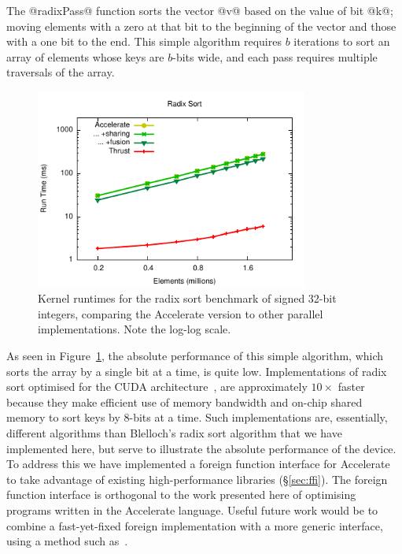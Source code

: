 The @radixPass@ function sorts the vector @v@ based on the value of
bit @k@; moving elements with a zero at that bit to the beginning of the
vector and those with a one bit to the end. This simple algorithm requires
$b$ iterations to sort an array of elements whose keys are $b$-bits wide, and
each pass requires multiple traversals of the array.

\begin{figure}
    \begin{center}
        \includegraphics[width=0.8\textwidth]{images/results/radixsort/radixsort}
    \end{center}
    \caption[Radix sort kernel benchmarks]{Kernel runtimes for the radix sort benchmark
        of signed 32-bit integers, comparing the Accelerate version to other
        parallel implementations. Note the log-log scale.}
    \label{fig:radixsort}
\end{figure}

As seen in Figure~\ref{fig:radixsort}, the absolute performance of this simple
algorithm, which sorts the array by a single bit at a time, is quite low.
Implementations of radix sort optimised for the CUDA
architecture~\cite{Satish:2009kx,Merrill:2011bz,ThrustAParallelT:ub}, are
approximately $10\times$ faster because they make efficient use of memory
bandwidth and on-chip shared memory to sort keys by 8-bits at a time. Such
implementations are, essentially, different algorithms than Blelloch's radix
sort algorithm that we have implemented here, but serve to illustrate the
absolute performance of the device. To address this we have implemented a
foreign function interface for Accelerate to take advantage of existing
high-performance libraries (\S\ref{sec:ffi}). The foreign function interface is
orthogonal to the work presented here of optimising programs written in the
Accelerate language. Useful future work would be to combine a fast-yet-fixed
foreign implementation with a more generic interface, using a method such
as~\cite{Henglein:2013dd}.


